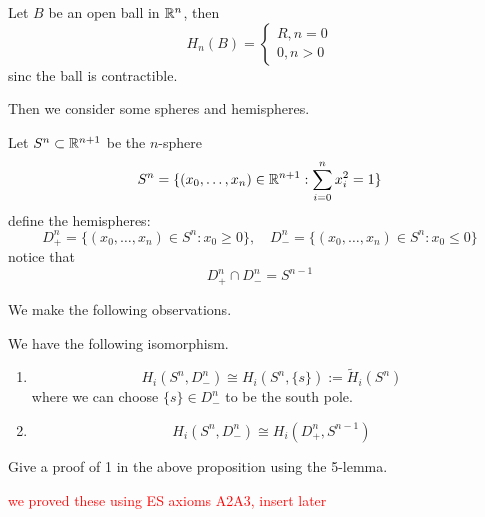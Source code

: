 \begin{cor}
    Let $B$ be an open ball in $\mathbb{R}^n$, then 
    \begin{equation*}
        H_n(B)=\begin{cases}
            R, n=0\\
            0, n>0
        \end{cases}
    \end{equation*}
    sinc the ball is contractible.
\end{cor}
Then we consider some spheres and hemispheres. 
\begin{defn}
    Let $S^n\subset\mathbb{R}^{n+1}$ be the $n$-sphere 
    \begin{equation*}
        S^n=\{(x_0,\dots, x_n)\in\mathbb{R}^{n+1}:\sum_{i=0}^nx_i^2=1\}
    \end{equation*}
    define the hemispheres:
    \begin{equation*}
        D_+^n=\{(x_0,\dots,x_n)\in S^n: x_0\geq 0\}, \quad D_-^n=\{(x_0,\dots,x_n)\in S^n: x_0\leq 0\}
    \end{equation*}
    notice that 
    \begin{equation*}
        D_+^n\cap D_-^n=S^{n-1}
    \end{equation*}
\end{defn}
We make the following observations.
\begin{prop}
    We have the following isomorphism.
    \begin{enumerate}
        \item \begin{equation*}
            H_i(S^n,D_-^n)\cong H_i(S^n,\{s\}):=\tilde{H}_i(S^n)
        \end{equation*}
        where we can choose $\{s\}\in D_-^n$ to be the south pole.
        \item \begin{equation*}
            H_i(S^n,D_-^n)\cong H_i(D_+^n,S^{n-1})
        \end{equation*}
    \end{enumerate}
\end{prop}
\begin{prob}[HW(2.9)]
    Give a proof of 1 in the above proposition using the 5-lemma.
\end{prob}
\textcolor{red}{we proved these using ES axioms A2A3, insert later}

